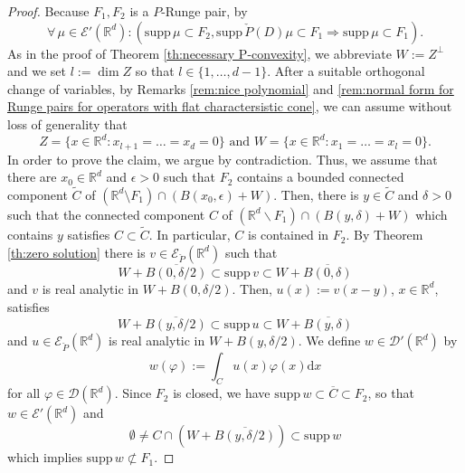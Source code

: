 \documentclass[a4paper,10pt]{amsart}
\newtheorem*{crucial lemma}{Lemma \ref{lem:nice polynomial2}}
\theoremstyle{definition}
\newcommand{\R}{\mathbb{R}}
\newcommand{\supp}{\mbox{supp}\,}
\begin{document}
\begin{proof}
	Because $F_1, F_2$ is a $P$-Runge pair, by \cite[Theorem 5]{CiasKalmes2025} 
	\begin{equation}\label{eq:P-Runge by supports}
		\forall\,\mu\in\mathscr{E}'(\R^d)\colon\left(\supp\mu\subset F_2, \supp\check{P}(D)\mu\subset F_1\Rightarrow \supp\mu\subset F_1\right).
	\end{equation}
	As in the proof of Theorem \ref{th:necessary P-convexity}, we abbreviate $W:=Z^\perp$ and we set $l:=\operatorname{dim}Z$ so that $l\in \{1,\ldots,d-1\}$. After a suitable orthogonal change of variables, by Remarks \ref{rem:nice polynomial} and \ref{rem:normal form for Runge pairs for operators with flat charactersistic cone}, we can assume without loss of generality that
	\[Z=\{x\in\R^d\colon x_{l+1}=\ldots=x_d=0\}\text{ and }W=\{x\in\R^d\colon x_1=\ldots=x_l=0\}.\]
	In order to prove the claim, we argue by contradiction. Thus, we assume that there are $x_0\in\R^d$ and $\epsilon>0$ such that $F_2$ contains a bounded connected component $\tilde{C}$ of $(\R^d\setminus F_1)\cap (B(x_0,\epsilon)+W)$. Then, there is $y\in \tilde{C}$ and $\delta>0$ such that the connected component $C$ of $(\R^d\backslash F_1)\cap (B(y,\delta)+W)$ which contains $y$ satisfies $C\subset\tilde{C}$. In particular, $C$ is contained in $F_2$. By Theorem \ref{th:zero solution} there is $v\in\mathscr{E}_{\check{P}}(\R^d)$ such that
	\[W+\overline{B(0,\delta/2)}\subset\supp v\subset W+\overline{B(0,\delta)}\]
	and $v$ is real analytic in $W+B(0,\delta/2)$. Then, $u(x):=v(x-y)$, $x\in\R^d$, satisfies
	\[W+\overline{B(y,\delta/2)}\subset\supp u\subset W+\overline{B(y,\delta)}\]
	and $u\in\mathscr{E}_{\check{P}}(\R^d)$ is real analytic in $W+B(y,\delta/2)$. 
	We define $w\in\mathscr{D}'(\R^d)$ by
	\[w(\varphi):=\int_C u(x)\varphi(x)\mathrm{d}x\]
    for all $\varphi\in\mathscr{D}(\R^d)$.
	Since $F_2$ is closed, we have $\supp w\subset \overline{C}\subset F_2$, so that $w\in\mathscr{E}'(\R^d)$ and
	\[\emptyset\neq C\cap \left(W+\overline{B(y,\delta/2)}\right)\subset \supp w\]
	which implies $\supp w\not\subset F_1$.
	

\end{proof}
\end{document}
